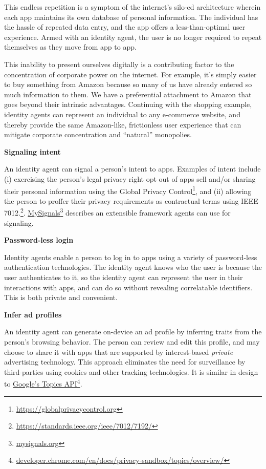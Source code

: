 \documentclass[11pt, oneside]{article}   	%
\newcommand{\hyperfootnote}[1][]{\def\ArgI{{#1}}\hyperfootnoteRelay}
\newcommand\hyperfootnoteRelay[2][]{\href{#1#2}{\ArgI}\footnote{\href{#1#2}{#2}}}
\begin{document}
This endless repetition is a symptom of the internet's silo-ed architecture wherein each app maintains its own database of personal information. The individual has the hassle of repeated data entry, and the app offers a less-than-optimal user experience. Armed with an identity agent, the user is no longer required to repeat themselves as they move from app to app.

This inability to present ourselves digitally is a contributing factor to the concentration of corporate power on the internet. For example, it's simply easier to buy something from Amazon because so many of us have already entered so much information to them. We have a preferential attachment to Amazon that goes beyond their intrinsic advantages. Continuing with the shopping example, identity agents can represent an individual to any e-commerce website, and thereby provide the same Amazon-like, frictionless user experience that can mitigate corporate concentration and ``natural'' monopolies. 

\textbf{Signaling intent}

An identity agent can signal a person's intent to apps. Examples of intent include (i) exercising the person's legal privacy right opt out of apps sell and/or sharing their personal information using the Global Privacy Control\footnote{\url{https://globalprivacycontrol.org}}, and (ii) allowing the person to proffer their privacy requirements as contractual terms using IEEE 7012.\footnote{\url{https://standards.ieee.org/ieee/7012/7192/}}. \hyperfootnote[MySignals][https://]{mysignals.org} describes an extensible framework agents can use for signaling.

\textbf{Password-less login}

Identity agents enable a person to log in to apps using a variety of password-less authentication technologies. The identity agent knows who the user is because the user authenticates to it, so the identity agent can represent the user in their interactions with apps, and can do so without revealing correlatable identifiers. This is both private and convenient.

\textbf{Infer ad profiles}

An identity agent can generate on-device an ad profile by inferring traits from the person's browsing behavior. The person can review and edit this profile, and may choose to share it with apps that are supported by interest-based \emph{private} advertising technology. This approach eliminates the need for surveillance by third-parties using cookies and other tracking technologies. It is similar in design to \hyperfootnote[Google's Topics API][https://]{developer.chrome.com/en/docs/privacy-sandbox/topics/overview/}.
\end{document}
